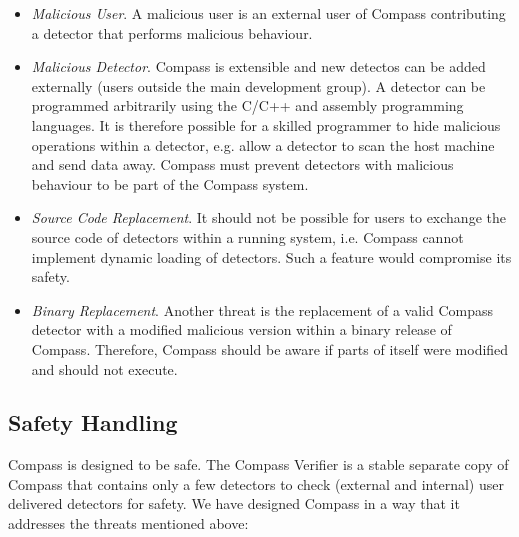 \begin{itemize}
\item \emph{Malicious User}. A malicious user is an external user of Compass contributing a detector that performs malicious behaviour.  
\item \emph{Malicious Detector}. Compass is extensible and new detectos can be added externally (users outside the main development group).
  A detector can be programmed arbitrarily using the C/C++ and assembly programming languages. 
  It is therefore possible for a skilled programmer to hide malicious operations within a detector, e.g. allow a detector to scan the host machine and
  send data away. Compass must prevent detectors with malicious behaviour to be part of the Compass system. 
\item \emph{Source Code Replacement}. It should not be possible for users to exchange the source code of detectors within a running system,
  i.e. Compass cannot implement dynamic loading of detectors. Such a feature would compromise its safety.
\item \emph{Binary Replacement}. Another threat is the replacement of a valid Compass detector with a modified malicious version within a binary release of Compass.
  Therefore, Compass should be aware if parts of itself were modified and should not execute.
\end{itemize} 

\subsection{Safety Handling}

Compass is designed to be safe. The Compass Verifier is a stable separate copy of Compass that contains only a few detectors
to check (external and internal) user delivered detectors for safety. We have designed Compass in a way that it addresses the threats mentioned above:

